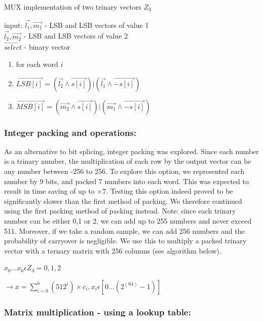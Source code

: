 \begin{algorithm}
		\caption{MUX implementation of two trinary vectors $Z_3$}
			\label{alg:algpack4} 

	
		input:   $\vec{l_1}, \vec{m_1}$ - LSB and LSB vectors of value 1  \\
					$\vec{l_2}, \vec{m_2}$ - LSB and LSB vectors of value 2 \\
					$\vec{select}$ - binary vector

	\begin{enumerate}
		\item for each word $i$
	    \item $\vec{LSB[i]} =( \vec{l_2} \land \vec{s[i]}) | (\vec{l_1} \land \vec{- s[i]})$
	    		    \item $\vec{MSB[i]} =( \vec{m_2} \land \vec{s[i]}) | (\vec{m_1} \land \vec{- s[i]})$
		
	\end{enumerate}
	
\end{algorithm}

\fi%

\subsubsection{Integer packing and operations:} As an alternative to bit splicing, integer packing was explored. Since each number is a trinary number, the multiplication of each row by the output vector can be any number between -256 to 256. To explore this option, we represented each number by 9 bits, and packed 7 numbers into each word. This was expected to result in time saving of up to $\times 7$. Testing this option indeed proved to be significantly slower than the first method of packing. We therefore continued using the first packing method of packing instead.
Note: since each trinary number can be either 0,1 or 2, we can add up to 255 numbers and never exceed 511. Moreover, if we take a random sample, we can add 256 numbers and the probability of carryover is negligible. We use this to multiply a packed trinary vector with a ternary matrix with 256 columns (see algorithm below).
	
	$x_0 \dots x_6 \epsilon Z_3 = {0,1,2}$
	
	$ \rightarrow x = \sum_{i=0}^{6} (512^i) \times c_i, x_i \epsilon [0 ... (2^(64)-1)]$



\subsubsection{Matrix multiplication - using a lookup table: }

